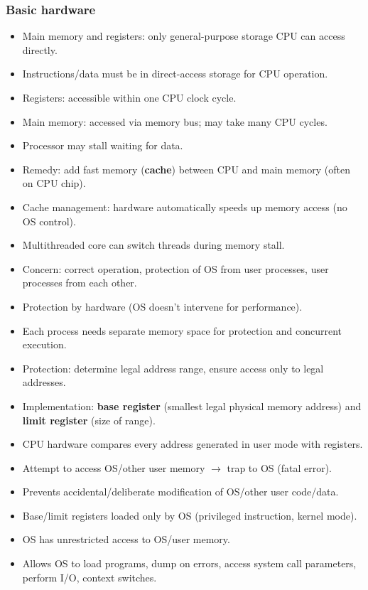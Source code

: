 \subsubsection*{Basic hardware}
\begin{itemize}
    \item Main memory and registers: only general-purpose storage CPU can access directly.
    \item Instructions/data must be in direct-access storage for CPU operation.
    \item Registers: accessible within one CPU clock cycle.
    \item Main memory: accessed via memory bus; may take many CPU cycles.
    \item Processor may stall waiting for data.
    \item Remedy: add fast memory (\textbf{cache}) between CPU and main memory (often on CPU chip).
    \item Cache management: hardware automatically speeds up memory access (no OS control).
    \item Multithreaded core can switch threads during memory stall.
    \item Concern: correct operation, protection of OS from user processes, user processes from each other.
    \item Protection by hardware (OS doesn't intervene for performance).
    \item Each process needs separate memory space for protection and concurrent execution.
    \item Protection: determine legal address range, ensure access only to legal addresses.
    \item Implementation: \textbf{base register} (smallest legal physical memory address) and \textbf{limit register} (size of range).
    \item CPU hardware compares every address generated in user mode with registers.
    \item Attempt to access OS/other user memory $\rightarrow$ trap to OS (fatal error).
    \item Prevents accidental/deliberate modification of OS/other user code/data.
    \item Base/limit registers loaded only by OS (privileged instruction, kernel mode).
    \item OS has unrestricted access to OS/user memory.
    \item Allows OS to load programs, dump on errors, access system call parameters, perform I/O, context switches.
\end{itemize}

